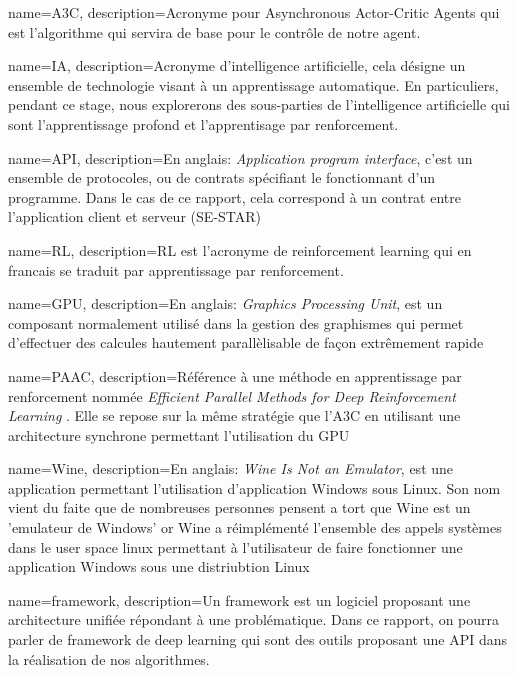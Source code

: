 
{
    name=A3C,
    description={Acronyme pour  Asynchronous Actor-Critic Agents qui est l'algorithme qui servira de base pour le contrôle de notre agent.}
}


{
    name=IA,
    description={Acronyme d'intelligence artificielle, cela désigne un ensemble de technologie visant à un apprentissage automatique. En particuliers, pendant ce stage, nous explorerons des sous-parties de l'intelligence artificielle qui sont l'apprentissage profond et l'apprentisage par renforcement.}
}


{
    name=API,
    description={En anglais: \emph{Application program interface}, c'est un ensemble de protocoles, ou de contrats spécifiant le fonctionnant d'un programme. Dans le cas de ce rapport, cela correspond à un contrat entre l'application client et serveur (SE-STAR)}
}

{
    name=RL,
    description={RL est l'acronyme de reinforcement learning qui en francais se traduit par apprentissage par renforcement.}
}


{
    name=GPU,
    description={En anglais: \emph{Graphics Processing Unit}, est un composant normalement utilisé dans la gestion des graphismes qui permet d'effectuer des calcules hautement parallèlisable de façon extrêmement rapide}
}

{
    name=PAAC,
    description={Référence à une méthode en apprentissage par renforcement nommée \emph{Efficient Parallel Methods for Deep Reinforcement Learning }\cite{2017arXiv170504862C}. Elle se repose sur la même stratégie que l'A3C en utilisant une architecture synchrone permettant l'utilisation du GPU} 
}

{
    name=Wine,
    description={En anglais: \emph{Wine Is Not an Emulator}, est une application permettant l'utilisation d'application Windows sous Linux. Son nom vient du faite que de nombreuses personnes pensent a tort que Wine est un 'emulateur de Windows' or Wine a réimplémenté l'ensemble des appels systèmes dans le user space linux permettant à l'utilisateur de faire fonctionner une application Windows sous une distriubtion Linux}
}


{
    name=framework,
    description={Un framework est un logiciel proposant une architecture unifiée répondant à une problématique. Dans ce rapport, on pourra parler de framework de deep learning qui sont des outils proposant une API dans la réalisation de nos algorithmes.}
}




